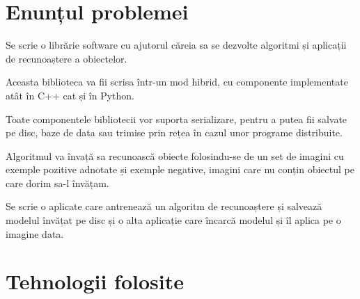 















\section{Enunțul problemei}
Se scrie o librărie software cu ajutorul căreia sa se dezvolte algoritmi și aplicații de recunoaștere a obiectelor.

Aceasta biblioteca va fii scrisa într-un mod hibrid, cu componente implementate atât în C++ cat și în Python.

Toate componentele bibliotecii vor suporta serializare, pentru a putea fii salvate pe disc, baze de data sau trimise prin rețea în cazul unor programe distribuite.

Algoritmul va învață sa recunoască obiecte folosindu-se de un set de imagini cu exemple pozitive adnotate și exemple negative, imagini care nu conțin obiectul pe care dorim sa-l învățam.

Se scrie o aplicate care antrenează un algoritm de recunoaștere și salvează modelul învățat pe disc și o alta aplicație care încarcă modelul și îl aplica pe o imagine data.


\section{Tehnologii folosite}

